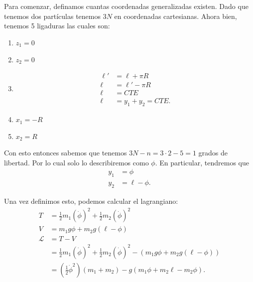 \documentclass{report}
\begin{document}
\section{}

\subsection{}

Para comenzar, definamos cuantas coordenadas generalizadas existen. Dado que tenemos dos partículas tenemos $3N$ en coordenadas cartesianas. Ahora bien, tenemos 5 ligaduras las cuales son:
\begin{enumerate}
  \item $z_1 = 0$ 
  \item $z_2 = 0$ 
  \item 
    \begin{align*}
      \ell' &= \ell + \pi R\\
      \ell &= \ell' - \pi R \\
      \ell &= CTE\\
      \ell &= y_1 + y_2 = CTE
    .\end{align*}
  \item $x_1 = -R$
  \item $x_2 = R$
\end{enumerate}

Con esto entonces sabemos que tenemos $3N - n = 3\cdot 2 - 5 = 1$ grados de libertad. Por lo cual solo lo describiremos como $\phi$. En particular, tendremos que 
\begin{align*}
  y_1 &= \phi \\
  y_2 &= \ell - \phi
.\end{align*}

Una vez definimos esto, podemos calcular el lagrangiano:
\begin{align*}
  T &= \frac{1}{2}m_1\left( \dot{\phi} \right)^2 + \frac{1}{2}m_2\left( \dot{\phi} \right)^2 \\ V &= m_1g\phi + m_2g\left( \ell - \phi \right)  \\
  \mathcal{L} &= T - V \\
  &= \frac{1}{2}m_1\left( \dot{\phi} \right)^2 + \frac{1}{2}m_2\left( \dot{\phi} \right)^2 - \left( m_1g\phi + m_2g\left(\ell-\phi\right)\right)\\
  &= \left( \frac{1}{2}\dot{\phi}^2 \right)\left( m_1 + m_2 \right) - g\left(m_1\phi+m_2\ell-m_2\phi \right)
.\end{align*}
\end{document}
